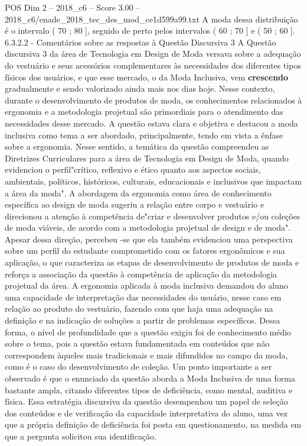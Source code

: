 \begin{textsample}{POS Dim 2 – 2018\_c6 – Score 3.00 – 2018\_c6/enade\_2018\_tec\_des\_mod\_ce1d599a99.txt}
A moda dessa distribuição é o intervalo ( 70 ; 80 ], seguido de perto pelos intervalos ( 60 ; 70 ] e ( 50 ; 60 ]. 6.3.2.2 - Comentários sobre as respostas à Questão Discursiva 3 A Questão discursiva 3 da área de Tecnologia em Design de Moda versava sobre a adequação do vestuário e seus acessórios complementares às necessidades dos diferentes tipos físicos dos usuários, e que esse mercado, o da Moda Inclusiva, vem \textbf{crescendo} gradualmente e sendo valorizado ainda mais nos dias hoje.
Nesse contexto, durante o desenvolvimento de produtos de moda, os conhecimentos relacionados à ergonomia e a metodologia projetual são primordiais para o atendimento das necessidades desse mercado.
A questão estava clara e objetiva e destacou a moda inclusiva como tema a ser abordado, principalmente, tendo em vista a ênfase sobre a ergonomia.
Nesse sentido, a temática da questão compreendeu as Diretrizes Curriculares para a área de Tecnologia em Design de Moda, quando evidenciou o perfil"crítico, reflexivo e ético quanto aos aspectos sociais, ambientais, políticos, históricos, culturais, educacionais e inclusivos que impactam a área da moda".
A abordagem da ergonomia como área de conhecimento específica ao design de moda sugeriu a relação entre corpo e vestuário e direcionou a atenção à competência de"criar e desenvolver produtos e/ou coleções de moda viáveis, de acordo com a metodologia projetual de design e de moda".
Apesar dessa direção, percebeu -se que ela também evidenciou uma perspectiva sobre um perfil do estudante comprometido com os fatores ergonômicos e sua aplicação, o que caracteriza as etapas de desenvolvimento de produtos de moda e reforça a associação da questão à competência de aplicação da metodologia projetual da área.
A ergonomia aplicada à moda inclusiva demandou do aluno uma capacidade de interpretação das necessidades do usuário, nesse caso em relação ao produto do vestuário, fazendo com que haja uma adequação na definição e na indicação de soluções a partir de problemas específicos.
Dessa forma, o nível de profundidade que a questão exigiu foi de conhecimento médio sobre o tema, pois a questão estava fundamentada em conteúdos que não correspondem àqueles mais tradicionais e mais difundidos no campo da moda, como é o caso do desenvolvimento de coleção.
Um ponto importante a ser observado é que o enunciado da questão aborda a Moda Inclusiva de uma forma bastante ampla, citando diferentes tipos de deficiência, como mental, auditiva e física.
Essa estratégia discursiva da questão desempenhou um papel de seleção dos conteúdos e de verificação da capacidade interpretativa do aluno, uma vez que a própria definição de deficiência foi posta em questionamento, na medida em que a pergunta solicitou sua identificação.

\end{textsample}
